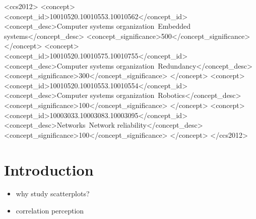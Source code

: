 \documentclass[manuscript, review, anonymous, screen]{acmart}
\providecommand{\tightlist}{%
  \setlength{\itemsep}{0pt}\setlength{\parskip}{0pt}}\usepackage{longtable,booktabs,array}
\begin{document}
\begin{CCSXML}
<ccs2012>
 <concept>
  <concept_id>10010520.10010553.10010562</concept_id>
  <concept_desc>Computer systems organization~Embedded systems</concept_desc>
  <concept_significance>500</concept_significance>
 </concept>
 <concept>
  <concept_id>10010520.10010575.10010755</concept_id>
  <concept_desc>Computer systems organization~Redundancy</concept_desc>
  <concept_significance>300</concept_significance>
 </concept>
 <concept>
  <concept_id>10010520.10010553.10010554</concept_id>
  <concept_desc>Computer systems organization~Robotics</concept_desc>
  <concept_significance>100</concept_significance>
 </concept>
 <concept>
  <concept_id>10003033.10003083.10003095</concept_id>
  <concept_desc>Networks~Network reliability</concept_desc>
  <concept_significance>100</concept_significance>
 </concept>
</ccs2012>
\end{CCSXML}




\maketitle

\setlength{\parskip}{-0.1pt}

\hypertarget{introduction}{%
\section{Introduction}\label{introduction}}

\begin{itemize}
\tightlist
\item
  why study scatterplots?
\item
  correlation perception
\end{itemize}
\end{document}
